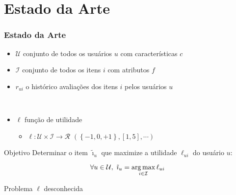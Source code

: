 \section[Estado da Arte]{Estado da Arte}
\begin{frame}
\frametitle{Estado da Arte}
\begin{itemize}
	\item $\mathcal{U}$ conjunto de todos os usuários $u$ com características $c$
	\item $\mathcal{I}$ conjunto de todos os itens $i$ com atributos $f$
	\item $r_{ui}$ o histórico avaliações dos itens $i$ pelos usuários $u$\par{~}
	\item $\ell$ função de utilidade 
	\begin{itemize}
		\item $\ell: \mathcal{U} \times \mathcal{I} \rightarrow \mathcal{R}$ $\left(\left\{-1, 0, +1\right\}, \left[1, 5\right], \cdots\right)$
	\end{itemize}
\end{itemize}


\begin{block}{Objetivo}
Determinar o item $\tilde{\imath}_u$ que maximize a utilidade $\ell_{ui}$ do usuário $u$:


\begin{equation} 
\label{eq:utilidade}
\forall u \in \mathcal{U}, ~ \tilde{\imath}_u = \operatorname*{arg\,max}_{i \in \mathcal{I}}{\ell_{ui}}
\end{equation}
\end{block}

\begin{alertblock}{Problema}
$\ell$ desconhecida
\end{alertblock}
\end{frame}




